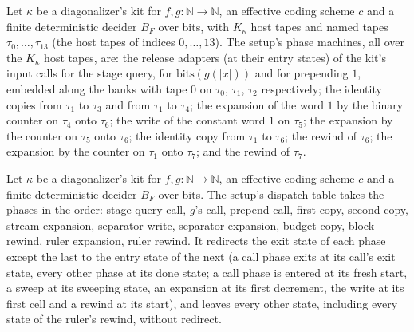 \begin{definition}
\label{Turing.NTimeDiag.dzSetM}
\leanok
{}
Let $\kappa$ be a diagonalizer's kit for $f, g : \mathbb{N} \to \mathbb{N}$, an effective coding scheme $c$ and a finite deterministic decider $B_F$ over bits, with $K_\kappa$ host tapes and named tapes $\tau_0, \dots, \tau_{13}$ (the host tapes of indices $0, \dots, 13$). The setup's phase machines, all over the $K_\kappa$ host tapes, are: the release adapters (at their entry states) of the kit's input calls for the stage query, for $\mathrm{bits}(g(|x|))$ and for prepending $1$, embedded along the banks with tape $0$ on $\tau_0$, $\tau_1$, $\tau_2$ respectively; the identity copies from $\tau_1$ to $\tau_3$ and from $\tau_1$ to $\tau_4$; the expansion of the word $1$ by the binary counter on $\tau_4$ onto $\tau_6$; the write of the constant word $1$ on $\tau_5$; the expansion by the counter on $\tau_5$ onto $\tau_6$; the identity copy from $\tau_1$ to $\tau_6$; the rewind of $\tau_6$; the expansion by the counter on $\tau_1$ onto $\tau_7$; and the rewind of $\tau_7$.
\end{definition}

\begin{definition}
\label{Turing.NTimeDiag.dzSetRed}
\leanok
{}
Let $\kappa$ be a diagonalizer's kit for $f, g : \mathbb{N} \to \mathbb{N}$, an effective coding scheme $c$ and a finite deterministic decider $B_F$ over bits. The setup's dispatch table takes the phases in the order: stage-query call, $g$'s call, prepend call, first copy, second copy, stream expansion, separator write, separator expansion, budget copy, block rewind, ruler expansion, ruler rewind. It redirects the exit state of each phase except the last to the entry state of the next (a call phase exits at its call's exit state, every other phase at its done state; a call phase is entered at its fresh start, a sweep at its sweeping state, an expansion at its first decrement, the write at its first cell and a rewind at its start), and leaves every other state, including every state of the ruler's rewind, without redirect.
\end{definition}

